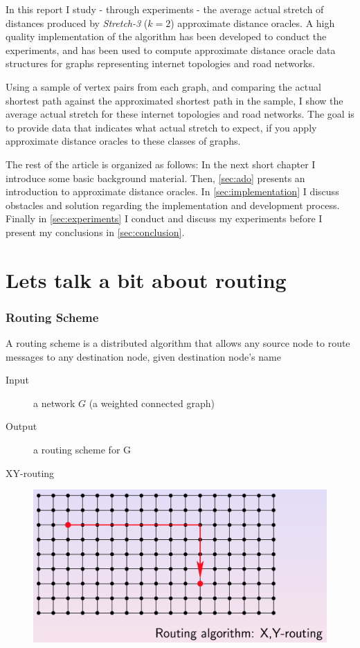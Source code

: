 In this report I study - through experiments - the average actual stretch of
distances produced by \emph{Stretch-3} ($k=2$) approximate distance oracles. A
high quality implementation of the algorithm has been developed to conduct
the experiments, and has been used to compute approximate distance oracle
data structures for graphs representing internet topologies and road networks.

Using a sample of vertex pairs from each graph, and comparing the actual
shortest path against the approximated shortest path in the sample, I show the
average actual stretch for these internet topologies and road networks. The
goal is to provide data that indicates what actual stretch to expect, if you
apply approximate distance oracles to these classes of graphs.

The rest of the article is organized as follows: In the next short chapter I
introduce some basic background material. Then, \autoref{sec:ado} presents an
introduction to approximate distance oracles. In \autoref{sec:implementation}
I discuss obstacles and solution regarding the implementation and development
process. Finally in \autoref{sec:experiments} I conduct and discuss my
experiments before I present my conclusions in \autoref{sec:conclusion}.




\section{Lets talk a bit about routing}

\begin{frame}[fragile]
  \frametitle{Routing Scheme}
    A routing scheme is a distributed algorithm that allows any
    source node to route messages to any destination node, given
    destination node's name

    \begin{description}
        \item[Input] a network $G$ (a weighted connected graph)
        \item[Output] a routing scheme for G
    \end{description}
\end{frame}

\begin{frame}{XY-routing}
  \begin{figure}
    \includegraphics[scale=0.3]{images/xyrouting.png} 
  \end{figure}
\end{frame}

